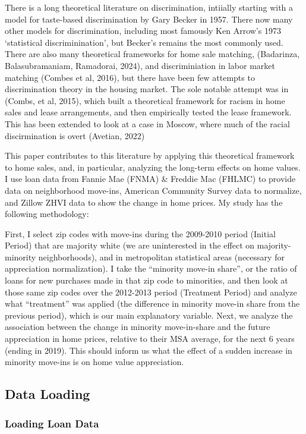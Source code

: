 \documentclass[11pt]{article}
\begin{document}
There is a long theoretical literature on discrimination, intiially
starting with a model for taste-based discrimination by Gary Becker in
1957. There now many other models for discrimination, including most
famously Ken Arrow's 1973 `statistical discriminination', but Becker's
remains the most commonly used. There are also many theoretical
frameworks for home sale matching, (Badarinza, Balasubramaniam,
Ramadorai, 2024), and discriminiation in labor market matching (Combes
et al, 2016), but there have been few attempts to discrimination theory
in the housing market. The sole notable attempt was in (Combs, et al,
2015), which built a theoretical framework for racism in home sales and
lease arrangements, and then empirically tested the lease framework.
This has been extended to look at a case in Moscow, where much of the
racial discirmination is overt (Avetian, 2022)

This paper contributes to this literature by applying this theoretical
framework to home sales, and, in particular, analyzing the long-term
effects on home values. I use loan data from Fannie Mae (FNMA) \&
Freddie Mac (FHLMC) to provide data on neighborhood move-ins, American
Community Survey data to normalize, and Zillow ZHVI data to show the
change in home prices. My study has the following methodology:

First, I select zip codes with move-ins during the 2009-2010 period
(Initial Period) that are majority white (we are uninterested in the
effect on majority-minority neighborhoods), and in metropolitan
statistical areas (necessary for appreciation normalization). I take the
``minority move-in share'', or the ratio of loans for new purchases made
in that zip code to minorities, and then look at those same zip codes
over the 2012-2013 period (Treatment Period) and analyze what
``treatment'' was applied (the difference in minority move-in share from
the previous period), which is our main explanatory variable. Next, we
analyze the association between the change in minority move-in-share and
the future appreciation in home prices, relative to their MSA average,
for the next 6 years (ending in 2019). This should inform us what the
effect of a sudden increase in minority move-ins is on home value
appreciation.

    \subsection{Data Loading}\label{data-loading}

    \subsubsection{Loading Loan Data}\label{loading-loan-data}
\end{document}
